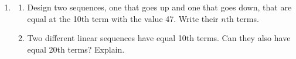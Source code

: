 \documentclass[11pt,a4paper]{article}
\newcommand{\ansline}[1][2.2cm]{\underline{\hspace{#1}}}
\begin{document}
\begin{enumerate}[resume]
\item
\begin{enumerate}
\item Design two sequences, one that goes up and one that goes down, that are equal
  at the 10th term with the value 47. Write their $n$th terms. \hfill
  \ansline[2.6cm] \quad \ansline[2.6cm]
\item Two different linear sequences have equal 10th terms. Can they also have equal
  20th terms? Explain.\par\vspace{1.9cm}\hrulefill
\end{enumerate}
\end{enumerate}
\end{document}

